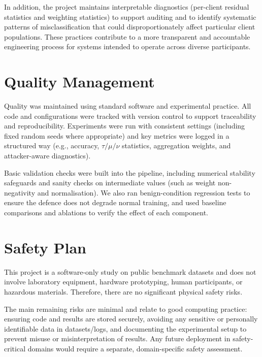 In addition, the project maintains interpretable diagnostics (per-client residual statistics and weighting statistics) to support auditing and to identify systematic patterns of misclassification that could disproportionately affect particular client populations. These practices contribute to a more transparent and accountable engineering process for systems intended to operate across diverse participants.

\section{Quality Management}

Quality was maintained using standard software and experimental practice. All code and configurations were tracked with version control to support traceability and reproducibility. Experiments were run with consistent settings (including fixed random seeds where appropriate) and key metrics were logged in a structured way (e.g., accuracy, $\tau/\mu/\nu$ statistics, aggregation weights, and attacker-aware diagnostics).

Basic validation checks were built into the pipeline, including numerical stability safeguards and sanity checks on intermediate values (such as weight non-negativity and normalisation). We also ran benign-condition regression tests to ensure the defence does not degrade normal training, and used baseline comparisons and ablations to verify the effect of each component.

\section{Safety Plan}

This project is a software-only study on public benchmark datasets and does not involve laboratory
equipment, hardware prototyping, human participants, or hazardous materials. Therefore, there are no
significant physical safety risks.

The main remaining risks are minimal and relate to good computing practice: ensuring code and results are
stored securely, avoiding any sensitive or personally identifiable data in datasets/logs, and documenting
the experimental setup to prevent misuse or misinterpretation of results. Any future deployment in
safety-critical domains would require a separate, domain-specific safety assessment.
